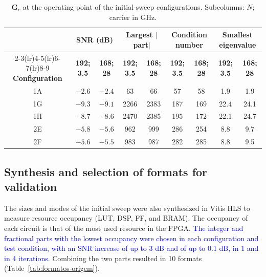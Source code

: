 \begin{table}[htbp]
\caption[$\mathbf{G}_c$ at the operating point of the initial-sweep configurations.]{$\mathbf{G}_c$ at the operating point of the initial-sweep configurations. Subcolumns: $N$; carrier in GHz.}
\label{tab:gc-ponto-operacao}
\vspace{4pt} %
\centering
\footnotesize
\renewcommand{\arraystretch}{1.2}
\setlength{\tabcolsep}{4pt}
\begin{tabular}{ccccccccc}
\toprule
 & \multicolumn{2}{c}{\textbf{SNR (dB)}} & \multicolumn{2}{c}{\textbf{Largest} {\boldmath $|$}\textbf{part}{\boldmath $|$}} & \multicolumn{2}{c}{\textbf{Condition number}} & \multicolumn{2}{c}{\textbf{Smallest eigenvalue}} \\
\cmidrule(lr){2-3}\cmidrule(lr){4-5}\cmidrule(lr){6-7}\cmidrule(lr){8-9}
\textbf{Configuration} & \textbf{192; 3.5} & \textbf{168; 28} & \textbf{192; 3.5} & \textbf{168; 28} & \textbf{192; 3.5} & \textbf{168; 28} & \textbf{192; 3.5} & \textbf{168; 28} \\
\midrule
1A & $-2.6$ & $-2.4$ & 63   & 66   & 57  & 58  & 1.9  & 1.9 \\
1G & $-9.3$ & $-9.1$ & 2266 & 2383 & 187 & 169 & 22.4 & 24.1 \\
1H & $-8.7$ & $-8.6$ & 2470 & 2385 & 195 & 172 & 22.1 & 24.7 \\
2E & $-5.8$ & $-5.6$ & 962  & 999  & 286 & 254 & 8.8  & 9.7 \\
2F & $-5.6$ & $-5.5$ & 983  & 987  & 282 & 285 & 8.8  & 9.5 \\
\bottomrule
\end{tabular}
\vspace{4pt}

\end{table}

\subsection{\texorpdfstring{Synthesis and selection of formats for validation}{Synthesis and selection of formats for validation}}

The sizes and modes of the initial sweep were also synthesized in Vitis HLS to measure resource occupancy (LUT, DSP, FF, and BRAM). The occupancy of each circuit is that of the most used resource in the FPGA. \textcolor{blue}{The integer and fractional parts with the lowest occupancy were chosen in each configuration and test condition, with an SNR increase of up to 3 dB and of up to 0.1 dB, in 1 and in 4 iterations.} Combining the two parts resulted in 10 formats (Table~\ref{tab:formatos-origem}).


